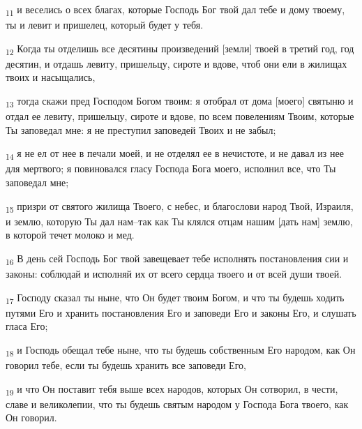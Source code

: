 \begin{tcolorbox}
\textsubscript{11} и веселись о всех благах, которые Господь Бог твой дал тебе и дому твоему, ты и левит и пришелец, который будет у тебя.
\end{tcolorbox}
\begin{tcolorbox}
\textsubscript{12} Когда ты отделишь все десятины произведений [земли] твоей в третий год, год десятин, и отдашь левиту, пришельцу, сироте и вдове, чтоб они ели в жилищах твоих и насыщались,
\end{tcolorbox}
\begin{tcolorbox}
\textsubscript{13} тогда скажи пред Господом Богом твоим: я отобрал от дома [моего] святыню и отдал ее левиту, пришельцу, сироте и вдове, по всем повелениям Твоим, которые Ты заповедал мне: я не преступил заповедей Твоих и не забыл;
\end{tcolorbox}
\begin{tcolorbox}
\textsubscript{14} я не ел от нее в печали моей, и не отделял ее в нечистоте, и не давал из нее для мертвого; я повиновался гласу Господа Бога моего, исполнил все, что Ты заповедал мне;
\end{tcolorbox}
\begin{tcolorbox}
\textsubscript{15} призри от святого жилища Твоего, с небес, и благослови народ Твой, Израиля, и землю, которую Ты дал нам--так как Ты клялся отцам нашим [дать нам] землю, в которой течет молоко и мед.
\end{tcolorbox}
\begin{tcolorbox}
\textsubscript{16} В день сей Господь Бог твой завещевает тебе исполнять постановления сии и законы: соблюдай и исполняй их от всего сердца твоего и от всей души твоей.
\end{tcolorbox}
\begin{tcolorbox}
\textsubscript{17} Господу сказал ты ныне, что Он будет твоим Богом, и что ты будешь ходить путями Его и хранить постановления Его и заповеди Его и законы Его, и слушать гласа Его;
\end{tcolorbox}
\begin{tcolorbox}
\textsubscript{18} и Господь обещал тебе ныне, что ты будешь собственным Его народом, как Он говорил тебе, если ты будешь хранить все заповеди Его,
\end{tcolorbox}
\begin{tcolorbox}
\textsubscript{19} и что Он поставит тебя выше всех народов, которых Он сотворил, в чести, славе и великолепии, что ты будешь святым народом у Господа Бога твоего, как Он говорил.
\end{tcolorbox}
